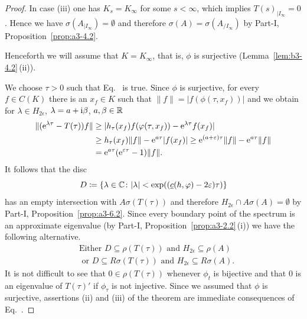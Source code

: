 \begin{proof}
	In case (iii) one has $K_{s} = K_{\infty}$ for some $s < \infty$, which implies $T(s)_{|I_{\infty}} = 0$.
	Hence we have $\sigma(A_{|I_{\infty}}) = \emptyset$ and therefore $\sigma(A) = \sigma(A_{/I_{\infty}})$ by Part-I, Proposition~\ref{prop:a3-4.2}.
	
	Henceforth we will assume that $K = K_{\infty}$, that is, $\phi$ is surjective (\cf Lemma~\ref{lem:b3-4.2}\,(ii)).
	
	We choose $\tau > 0$ such that Eq.~ is true.
	Since $\phi$ is surjective, for every $f \in C(K)$ there is an $x_{f} \in K$ such that $\|f\| = |f(\phi(\tau,x_{f}))|$ and we obtain for $\lambda \in H_{2\epsilon}$, $\lambda = a + \mathrm{i}\beta$, $a,\beta \in \mathbb{R}$
	\begin{equation}\label{eq:b3-4.9}
		\begin{aligned}
			\|(\eu^{\lambda\tau} - T(\tau))f\| &\geq |h_{\tau}(x_{f})f(\phi(\tau,x_{f})) - \eu^{\lambda\tau}f(x_{f})| \\
			& \geq h_{\tau}(x_{f})\|f\| - \eu^{a\tau}|f(x_{f})| 
			 \geq \eu^{(a+\epsilon)\tau}\|f\| - \eu^{a\tau}\|f\| \\
			&= \eu^{a\tau}(\eu^{\epsilon\tau} - 1)\|f\|.
		\end{aligned}
	\end{equation}
	It follows that the disc 
    \[
    D \coloneq \{\lambda \in \C \colon |\lambda| < \exp((\underline{c}(h,\phi)-2\epsilon)\tau)\}
    \]
    has an empty intersection with $A{\sigma}(T(\tau))$ and therefore $H_{2\epsilon}\cap A\sigma(A) = \emptyset$ by Part-I, Proposition~\ref{prop:a3-6.2}.
	Since every boundary point of the spectrum is an approximate eigenvalue (by Part-I, Proposition~\ref{prop:a3-2.2}\,(i)) we have the following alternative.
	\begin{equation}\label{eq:b3-4.10}
		\begin{aligned}
		&\text{Either } D \subseteq \rho(T(\tau)) \text{ and } H_{2\epsilon} \subseteq \rho(A) \\
		&\text{ or } D \subseteq R{\sigma}(T(\tau)) \text{ and } H_{2\epsilon} \subseteq R{\sigma}(A).
	\end{aligned}
	\end{equation}
	It is not difficult to see that $0 \in \rho(T(\tau))$ whenever $\phi_{t}$ is bijective and that $0$ is an eigenvalue of\/ $T(\tau)'$ if\/ $\phi_{\tau}$ is not injective.
	Since we assumed that $\phi$ is surjective, assertions (ii) and (iii) of the theorem are immediate consequences of Eq.~.
\end{proof}

